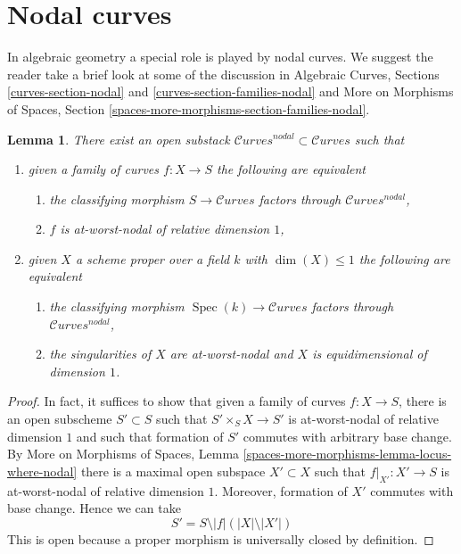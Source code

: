 \documentclass{stacks-project}
\theoremstyle{plain}
\newtheorem{lemma}[subsection]{Lemma}
\theoremstyle{definition}
\theoremstyle{remark}
\numberwithin{equation}{subsection}
\def\Spec{\mathop{\mathrm{Spec}}}
\def\Curvesstack{\mathcal{C}\!\mathit{urves}}
\begin{document}
\section{Nodal curves}
\label{section-nodal-curves}

\noindent
In algebraic geometry a special role is played by nodal curves.
We suggest the reader take a brief look at some of the discussion
in Algebraic Curves, Sections \ref{curves-section-nodal} and
\ref{curves-section-families-nodal}
and More on Morphisms of Spaces, Section
\ref{spaces-more-morphisms-section-families-nodal}.

\begin{lemma}
\label{lemma-nodal-curves}
There exist an open substack $\Curvesstack^{nodal} \subset \Curvesstack$
such that
\begin{enumerate}
\item given a family of curves $f : X \to S$ the following are equivalent
\begin{enumerate}
\item the classifying morphism $S \to \Curvesstack$ factors
through $\Curvesstack^{nodal}$,
\item $f$ is at-worst-nodal of relative dimension $1$,
\end{enumerate}
\item given $X$ a scheme proper over a field $k$ with
$\dim(X) \leq 1$ the following are equivalent
\begin{enumerate}
\item the classifying morphism $\Spec(k) \to \Curvesstack$ factors
through $\Curvesstack^{nodal}$,
\item the singularities of $X$ are at-worst-nodal and $X$
is equidimensional of dimension $1$.
\end{enumerate}
\end{enumerate}
\end{lemma}

\begin{proof}
In fact, it suffices to show that given a family of curves
$f : X \to S$, there is an open subscheme $S' \subset S$
such that $S' \times_S X \to S'$ is at-worst-nodal of relative dimension $1$
and such that formation of $S'$ commutes with arbitrary base change.
By More on Morphisms of Spaces, Lemma
\ref{spaces-more-morphisms-lemma-locus-where-nodal}
there is a maximal open subspace $X' \subset X$ such
that $f|_{X'} : X' \to S$ is at-worst-nodal of relative dimension $1$.
Moreover, formation of $X'$ commutes with base change.
Hence we can take
$$
S' = S \setminus |f|(|X| \setminus |X'|)
$$
This is open because a proper morphism is universally closed by
definition.
\end{proof}
\end{document}
